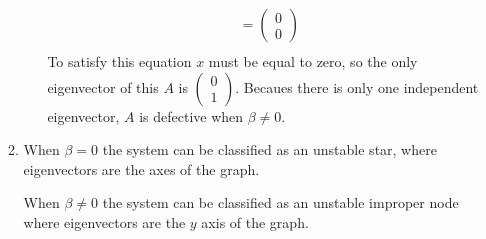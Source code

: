 \documentclass[10pt]{article}
\begin{document}
\begin{enumerate}
\begin{enumerate}
\begin{enumerate}
\begin{align*}
                        &=
                      \begin{pmatrix} 0 \\ 0 \end{pmatrix} \\
                    \end{align*}
                  To satisfy this equation $x$ must be equal to zero, so the only eigenvector of this $A$ is
                      $\begin{pmatrix} 0 \\ 1 \end{pmatrix}$.  Becaues there is
                        only one independent eigenvector, $A$ is defective when
                        $\beta \not= 0$.
              \end{enumerate}
      \item When $\beta = 0$ the system can be classified as an unstable star,
        where eigenvectors are the axes of the graph.

      \pagebreak

      When $\beta \not= 0$ the system can be classified as an unstable improper
      node where eigenvectors are the $y$ axis of the graph.


\end{enumerate}
\end{enumerate}
\end{document}

